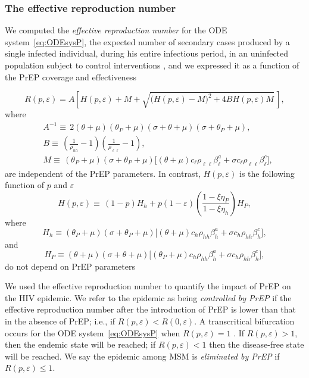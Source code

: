 \documentclass[11pt]{article}
\begin{document}
\subsubsection{The effective reproduction number}

We computed the {\it effective reproduction number} for the ODE system~\eqref{eq:ODEsysP}, the expected number of secondary cases produced by a single infected individual, during his entire infectious period, in an uninfected population subject to control interventions \cite{Anderson1991,VanDenDriessche2008}, and we expressed it as a function of the PrEP coverage and effectiveness

\begin{equation}
	R(p,\varepsilon) = A \left[ H(p,\varepsilon) + M + \sqrt{ \Big(H(p,\varepsilon) - M\Big)^2 + 4 B H(p,\varepsilon) M }\,\right],
\end{equation}
where 
\begin{align} 
	& A^{-1} \equiv \, 2 (\theta+\mu) (\theta_P+\mu) (\sigma+\theta+\mu) (\sigma+\theta_P+\mu),\\
	& B \equiv \, \left(\frac{1}{\rho_{h h}}-1\right) \left(\frac{1}{\rho_{\ell \ell}}-1\right),\\
	& M \equiv \, (\theta_P+\mu) (\sigma+\theta_P+\mu) \Big[(\theta+\mu) c_\ell \rho_{\ell \ell}\beta_\ell^a+\sigma c_\ell \rho_{\ell \ell}\beta_\ell^c\Big], \end{align}
are independent of the PrEP parameters. In contrast, $H(p,\varepsilon)$ is the following function of $p$ and $\varepsilon$
\begin{equation}
	H(p,\varepsilon) \equiv \, (1-p) H_h + p (1-\varepsilon) \left( \frac{1-\xi \eta_P}{1-\xi \eta_h}\right) H_P,
\end{equation}
where
\begin{equation}
H_h \equiv (\theta_P+\mu) (\sigma+\theta_P+\mu) \Big[ (\theta+\mu) c_h \rho_{hh} \beta_h^a + \sigma c_h \rho_{hh} \beta_h^c \Big],
\end{equation}
and
\begin{equation}
H_P \equiv (\theta+\mu) (\sigma+\theta+\mu) \Big[ (\theta_P+\mu) c_h \rho_{hh} \beta_h^a + \sigma c_h \rho_{hh} \beta_h^c\Big],
\end{equation}
do not depend on PrEP parameters

We used the effective reproduction number to quantify the impact of PrEP on the HIV epidemic. We refer to the epidemic as being {\it controlled by PrEP} if the effective reproduction number after the introduction of PrEP is lower than that in the absence of PrEP; i.e., if $R(p,\varepsilon) < R(0,\varepsilon)$. A transcritical bifurcation occurs for the ODE system~\eqref{eq:ODEsysP} when $R(p,\varepsilon)=1$ \cite{Jacquez1988,VanDenDriessche2008}. If $R(p,\varepsilon)>1$, then the endemic state will be reached; if $R(p,\varepsilon) < 1$ then the disease-free state will be reached. We say the epidemic among MSM is {\it eliminated by PrEP} if $R(p,\varepsilon) \leq 1$. 
\end{document}
